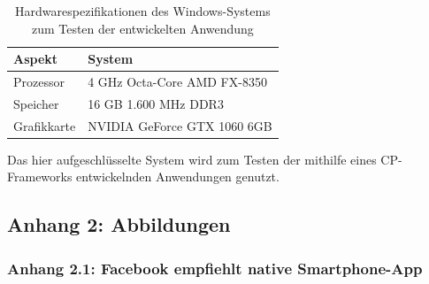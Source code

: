 \documentclass[a4paper]{scrartcl}
\begin{document}
\begin{table}[H]
	\centering
	\caption{Hardwarespezifikationen des Windows-Systems zum Testen der entwickelten Anwendung}
	\begin{center}
		\begin{tabularx}{\linewidth}{| l | X |}
			\hline
			Aspekt & System \\ 
			\hline \hline
			Prozessor & 4 GHz Octa-Core AMD FX-8350 \\
			\hline
			Speicher & 16 GB 1.600 MHz DDR3 \\
			\hline
			Grafikkarte & NVIDIA GeForce GTX 1060 6GB \\
			\hline
		\end{tabularx}
	\end{center}
	Das hier aufgeschlüsselte System wird zum Testen der mithilfe eines CP-Frameworks entwickelnden Anwendungen genutzt.
\end{table}

\newpage

\subsection*{Anhang 2: Abbildungen}

\subsubsection*{Anhang 2.1: Facebook empfiehlt native Smartphone-App}
\end{document}
